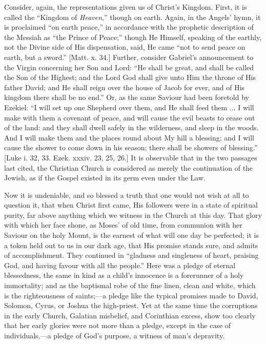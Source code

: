 Consider, again, the representations given us of Christ's Kingdom.
First, it is called the ``Kingdom of \emph{Heaven},'' though
on earth. Again, in the Angels' hymn, it is proclaimed ``on earth
peace,'' in accordance with the prophetic description of the
Messiah as ``the Prince of Peace;'' though He Himself,
speaking of the earthly, not the Divine side of His dispensation,
said, He came ``not to send peace on earth, but a sword.''
[Matt. x. 34.] Further, consider Gabriel's announcement to the Virgin
concerning her Son and Lord: ``He shall be great, and shall be
called the Son of the Highest; and the Lord God shall give unto Him
the throne of His father David; and He shall reign over the house of
Jacob for ever, and of His kingdom there shall be no end.'' Or, as
the same Saviour had been foretold by Ezekiel: ``I will set up one
Shepherd over them, and He shall feed them ... I will make with them a
covenant of peace, and will cause the evil beasts to cease out of the
land: and they shall dwell safely in the wilderness, and sleep in the
woods. And I will make them and the places round about My hill a
blessing; and I will cause the shower to come down in his season;
there shall be showers of blessing.'' [Luke i. 32, 33. Ezek. xxxiv.
23, 25, 26.] It is observable that in the two passages last cited, the
Christian Church is considered as merely the continuation of the
Jewish, as if the Gospel existed in its germ even under the Law.

Now it is undeniable, and so blessed a truth that one would not
wish at all to question it, that when Christ first came, His followers
were in a state of spiritual purity, far above anything which we
witness in the Church at this day. That glory with which her face
shone, as Moses' of old time, from communion with her Saviour on the
holy Mount, is the earnest of what will one day be perfected; it is a
token held out to us in our dark age, that His promise stands sure,
and admits of accomplishment. They continued in ``gladness and
singleness of heart, praising God, and having favour with all the
people.'' Here was a pledge of eternal blessedness, the same in
kind as a child's innocence is a forerunner of a holy immortality; and
as the baptismal robe of the fine linen, clean and white, which is the
righteousness of saints;—a pledge like the typical promises made to
David, Solomon, Cyrus, or Joshua the high-priest. Yet at the same time
the corruptions in the early Church, Galatian misbelief, and
Corinthian excess, show too clearly that her early glories were not
more than a pledge, except in the case of individuals,—a pledge of
God's purpose, a witness of man's depravity.

